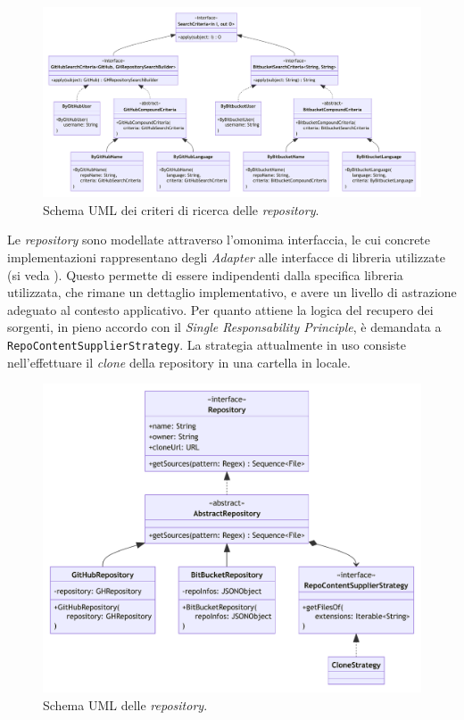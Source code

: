 \begin{figure}
    \centering
    \includegraphics[width=\textwidth]{resources/img/02-search-criteria.pdf}
    \caption{Schema UML dei criteri di ricerca delle \textit{repository}.}
    \label{img:02-search-criteria}
\end{figure}

Le \textit{repository} sono modellate attraverso l'omonima interfaccia, le cui concrete implementazioni rappresentano degli \textit{Adapter} \cite{gof} alle interfacce di libreria utilizzate (si veda ).
%
Questo permette di essere indipendenti dalla specifica libreria utilizzata, che rimane un dettaglio implementativo, e avere un livello di astrazione adeguato al contesto applicativo.
%
Per quanto attiene la logica del recupero dei sorgenti, in pieno accordo con il \textit{Single Responsability Principle}, è demandata a \texttt{RepoContentSupplierStrategy}.
%
La strategia attualmente in uso consiste nell'effettuare il \textit{clone} della repository in una cartella in locale.

\begin{figure}[h!]
    \centering
    \includegraphics[width=\textwidth]{resources/img/02-repos.pdf}
    \caption{Schema UML delle \textit{repository}.}
    \label{img:02-repos}
\end{figure}

